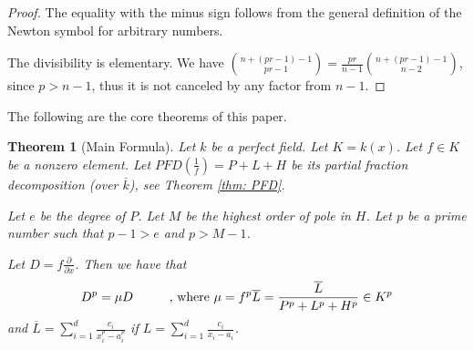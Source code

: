 \documentclass{amsart}
\newtheorem{thm}{Theorem}[section]
\theoremstyle{definition}
\begin{document}
\begin{proof}
    The equality with the minus sign follows from the general definition of the Newton symbol for arbitrary numbers.

    The divisibility is elementary. We have $\binom{n+(pr-1)-1}{pr-1}=\frac{pr}{n-1}\binom{n+(pr-1)-1}{n-2}$, since $p>n-1$, thus it is not canceled by any factor from $n-1$.
\end{proof}

The following are the core theorems of this paper.

\begin{thm}[Main Formula]\label{Main Formula}
    Let $k$ be a perfect field. Let $K= k(x)$.
    Let $f\in K$ be a nonzero element.
    Let $PFD(\frac{1}{f})=P+L+H$ be its partial fraction decomposition (over $\overline{k}$), see Theorem \ref{thm: PFD}.

    Let $e$ be the degree of $P$. Let $M$ be the highest order of pole in $H$. Let $p$ be a prime number such that $p-1>e$ and $p>M-1$.

    Let $D=f\frac{\partial}{\partial x}$.
    Then we have that
    \begin{equation}
        D^p= \mu D \hspace{1 cm} \text{, where } \mu=f^p\overline{L}=\frac{\overline{L}}{P^p+L^p+H^p}\in K^p
    \end{equation}
    and $\overline{L}=\sum_{i=1}^d \frac{c_i}{x_i^p-a_i^p}$ if ${L}=\sum_{i=1}^d \frac{c_i}{x_i-a_i}$.
\end{thm}
\end{document}
